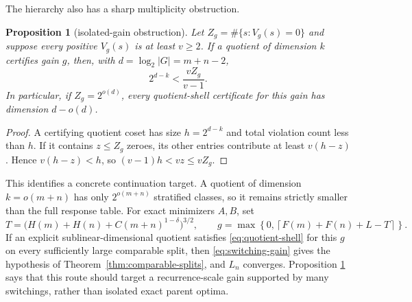 \documentclass[11pt]{article}
\newtheorem{proposition}[theorem]{Proposition}
\theoremstyle{definition}
\theoremstyle{remark}
\begin{document}
The hierarchy also has a sharp multiplicity obstruction.

\begin{proposition}[isolated-gain obstruction]\label{prop:quotient-obstruction}
Let
$Z_g=\#\{s:V_g(s)=0\}$ and suppose every positive $V_g(s)$ is at least
$v\ge2$.  If a quotient of dimension $k$ certifies gain $g$, then, with
$d=\log_2|G|=m+n-2$,
\begin{equation}\label{eq:quotient-dimension-lower}
 2^{d-k}<\frac{vZ_g}{v-1}.
\end{equation}
In particular, if $Z_g=2^{o(d)}$, every quotient-shell certificate for this
gain has dimension $d-o(d)$.
\end{proposition}

\begin{proof}
A certifying quotient coset has size $h=2^{d-k}$ and total violation count
less than $h$.  If it contains $z\le Z_g$ zeroes, its other entries contribute
at least $v(h-z)$.  Hence
$v(h-z)<h$, so $(v-1)h<vz\le vZ_g$.
\end{proof}

This identifies a concrete continuation target.  A quotient of dimension
$k=o(m+n)$ has only $2^{o(m+n)}$ stratified classes, so it remains strictly
smaller than the full response table.  For exact minimizers $A,B$, set
\[
 T=\bigl(H(m)+H(n)+C(m+n)^{1-\delta}\bigr)^{3/2},
 \qquad
 g=\max\left\{0,\left\lceil F(m)+F(n)+L-T\right\rceil\right\}.
\]
If an explicit sublinear-dimensional quotient satisfies
\eqref{eq:quotient-shell} for this $g$ on every sufficiently large comparable
split, then \eqref{eq:switching-gain} gives the hypothesis of
Theorem~\ref{thm:comparable-splits}, and $L_n$ converges.  Proposition
\ref{prop:quotient-obstruction} says that this route should target a
recurrence-scale gain supported by many switchings, rather than isolated
exact parent optima.
\end{document}
